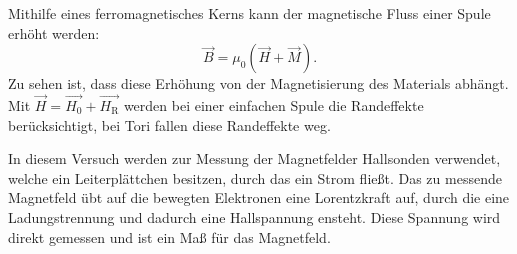 Mithilfe eines ferromagnetisches Kerns kann der magnetische Fluss einer Spule erhöht werden:
\begin{equation*}
\vec{B} = \mu_0 (\vec{H} + \vec{M}).
\end{equation*}
Zu sehen ist, dass diese Erhöhung von der Magnetisierung des Materials abhängt.  Mit $\vec{H} = \vec{H_0} + \vec{H_{\text{R}}}$ werden bei einer einfachen Spule die
Randeffekte berücksichtigt, bei Tori fallen diese Randeffekte weg.

In diesem Versuch werden zur Messung der Magnetfelder Hallsonden verwendet, welche ein Leiterplättchen besitzen, durch das ein Strom fließt. Das zu messende Magnetfeld
übt auf die bewegten Elektronen eine Lorentzkraft auf, durch die eine Ladungstrennung und dadurch eine Hallspannung ensteht. Diese Spannung wird direkt gemessen und ist ein
Maß für das Magnetfeld. 